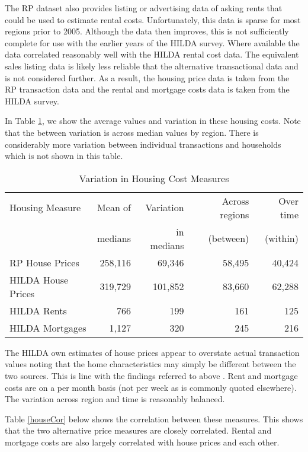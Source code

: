 \documentclass[12pt]{article}
\begin{document}
The RP dataset also provides listing or advertising data of asking rents that could be used to estimate rental costs. Unfortunately, this data is sparse for most regions prior to 2005. Although the data then improves, this is not sufficiently complete for use with the earlier years of the HILDA survey. Where available the data correlated reasonably well with the HILDA rental cost data. The equivalent sales listing data is likely less reliable that the alternative transactional data and is not considered further. As a result, the housing price data is taken from the RP transaction data and the rental and mortgage costs data is taken from the HILDA survey.

In Table \ref{houseVar}, we show the average values and variation in these housing costs. Note that the between variation is across median values by region. There is considerably more variation between individual transactions and households which is not shown in this table.

\begin{table}[htpb]
\centering
\caption{Variation in Housing Cost Measures}
\label{houseVar}
\begin{tabular}{lrrrr}
\toprule
Housing Measure & Mean of & Variation & Across regions & Over time\tabularnewline
 & medians & in medians & (between) & (within)\tabularnewline
\midrule
  RP House Prices & 258,116 & 69,346 & 58,495 & 40,424 \\
  HILDA House Prices & 319,729 & 101,852 & 83,660 & 62,288 \\
  HILDA Rents & 766 & 199 & 161 & 125 \\
  HILDA Mortgages & 1,127 & 320 & 245 & 216 \\
\bottomrule
\end{tabular}
\end{table}

The HILDA own estimates of house prices appear to overstate actual transaction values noting that the home characteristics may simply be different between the two sources. This is line with the findings referred to above \parencite{henriques2013perceptions}. Rent and mortgage costs are on a per month basis (not per week as is commonly quoted elsewhere). The variation across region and time is reasonably balanced.

Table \ref{houseCor} below shows the correlation between these measures. This shows that the two alternative price measures are closely correlated. Rental and mortgage costs are also largely correlated with house prices and each other.
\end{document}
